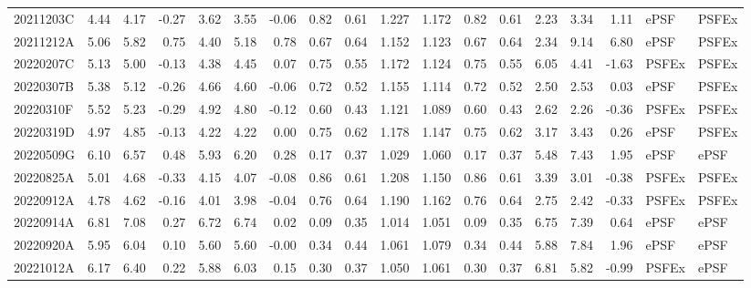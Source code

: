 \begin{longtable}{lrrrrrrrrrrrrrrrll}
 20211203C & 4.44 & 4.17 & -0.27 & 3.62 & 3.55 & -0.06 & 0.82 & 0.61 & 1.227 & 1.172 & 0.82 & 0.61 & 2.23 & 3.34 & 1.11 & ePSF & PSFEx \\
 20211212A & 5.06 & 5.82 & 0.75 & 4.40 & 5.18 & 0.78 & 0.67 & 0.64 & 1.152 & 1.123 & 0.67 & 0.64 & 2.34 & 9.14 & 6.80 & ePSF & PSFEx \\
 20220207C & 5.13 & 5.00 & -0.13 & 4.38 & 4.45 & 0.07 & 0.75 & 0.55 & 1.172 & 1.124 & 0.75 & 0.55 & 6.05 & 4.41 & -1.63 & PSFEx & PSFEx \\
 20220307B & 5.38 & 5.12 & -0.26 & 4.66 & 4.60 & -0.06 & 0.72 & 0.52 & 1.155 & 1.114 & 0.72 & 0.52 & 2.50 & 2.53 & 0.03 & ePSF & PSFEx \\
 20220310F & 5.52 & 5.23 & -0.29 & 4.92 & 4.80 & -0.12 & 0.60 & 0.43 & 1.121 & 1.089 & 0.60 & 0.43 & 2.62 & 2.26 & -0.36 & PSFEx & PSFEx \\
 20220319D & 4.97 & 4.85 & -0.13 & 4.22 & 4.22 & 0.00 & 0.75 & 0.62 & 1.178 & 1.147 & 0.75 & 0.62 & 3.17 & 3.43 & 0.26 & ePSF & PSFEx \\
 20220509G & 6.10 & 6.57 & 0.48 & 5.93 & 6.20 & 0.28 & 0.17 & 0.37 & 1.029 & 1.060 & 0.17 & 0.37 & 5.48 & 7.43 & 1.95 & ePSF & ePSF \\
 20220825A & 5.01 & 4.68 & -0.33 & 4.15 & 4.07 & -0.08 & 0.86 & 0.61 & 1.208 & 1.150 & 0.86 & 0.61 & 3.39 & 3.01 & -0.38 & PSFEx & PSFEx \\
 20220912A & 4.78 & 4.62 & -0.16 & 4.01 & 3.98 & -0.04 & 0.76 & 0.64 & 1.190 & 1.162 & 0.76 & 0.64 & 2.75 & 2.42 & -0.33 & PSFEx & PSFEx \\
 20220914A & 6.81 & 7.08 & 0.27 & 6.72 & 6.74 & 0.02 & 0.09 & 0.35 & 1.014 & 1.051 & 0.09 & 0.35 & 6.75 & 7.39 & 0.64 & ePSF & ePSF \\
 20220920A & 5.95 & 6.04 & 0.10 & 5.60 & 5.60 & -0.00 & 0.34 & 0.44 & 1.061 & 1.079 & 0.34 & 0.44 & 5.88 & 7.84 & 1.96 & ePSF & ePSF \\
 20221012A & 6.17 & 6.40 & 0.22 & 5.88 & 6.03 & 0.15 & 0.30 & 0.37 & 1.050 & 1.061 & 0.30 & 0.37 & 6.81 & 5.82 & -0.99 & PSFEx & ePSF \\
\hline
\end{longtable}